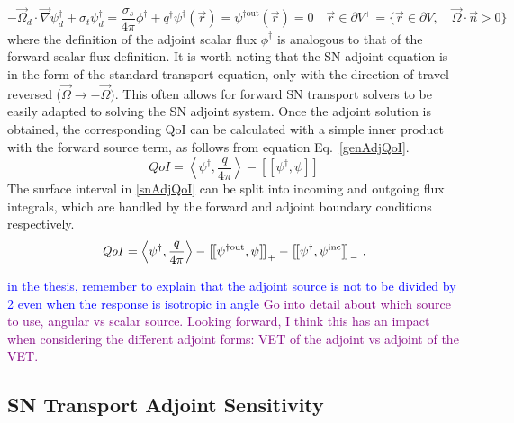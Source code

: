 \documentclass[12pt]{report}
\newcommand{\vr}{\vec{r}}
\newcommand{\vO}{\vec{\Omega}}
\newcommand{\bra}{\left\langle}
\newcommand{\ket}{\right\rangle}
\newcommand{\sbraSN}{\left[ \! \left[}
\newcommand{\sketSN}{\right] \! \right]}
\newcommand{\grad}{\vec{\nabla}}
\newcommand{\bound}{\partial V}
\newcommand{\sigt}{\sigma_t}
\newcommand{\sigs}{\sigma_s}
\newcommand{\angSource}{\frac{q}{4 \pi}}
\newcommand{\scalResp}{q^\dag}
\newcommand{\qoi}{{\it QoI}\xspace}
\newcommand{\comment}[2]{\marginpar{\textcolor{#2}{$\star$}}\textcolor{#2}{#1}\newline}
\newcommand{\jcr}[1]{\comment{#1}{blue}}
\newcommand{\todo}[1]{\comment{#1}{purple}}
\newcommand{\jcr}[1]{\phantom{a}}
\newcommand{\todo}[1]{\phantom{a}}
\begin{document}
\begin{subequations}
\begin{equation}
- \vO_d \cdot \grad \psi^\dag_d + \sigt \psi^\dag_d = \frac{\sigs}{4 \pi} \phi^\dag + \scalResp
\end{equation}
\begin{equation}
\psi^\dag(\vr) = \psi^{\dag \text{out}}(\vr)=0 \quad \vr \in \partial V^{+} = \{  \vr \in \bound , \quad \vO \cdot \vec{n} > 0 \}
\end{equation}
\end{subequations}
where the definition of the adjoint scalar flux $\phi^\dag$ is analogous to that of 
the forward scalar flux definition. It is worth noting that the SN adjoint equation is in the form of the standard transport equation, only with the direction of travel reversed ($\vO \to -\vO)$. This often allows for forward SN transport solvers to be easily adapted to solving the SN adjoint system. Once the adjoint solution is obtained, the corresponding QoI can be calculated with a simple inner product with the forward source term, as follows from equation Eq.~\eqref{genAdjQoI}. %
\begin{equation}
\label{snAdjQoI}
QoI = \bra \psi^\dag , \angSource \ket - \sbraSN \psi^\dag,  \psi \sketSN
\end{equation}
%
The surface interval in \eqref{snAdjQoI} can be split into incoming and outgoing flux integrals, which are handled by the forward and adjoint boundary conditions respectively. 
%
\begin{equation}
\label{snAdjQoIBCsplit}
\qoi = \bra \psi^\dag , \angSource \ket - \sbraSN \psi^{\dag \text{out}},  \psi \sketSN_+ - \sbraSN \psi^\dag,  \psi^{\text{inc}} \sketSN_- \,.
\end{equation}

\jcr{in the thesis, remember to explain that the adjoint source is not to be divided by 2 even when the response is isotropic in angle}
\todo{Go into detail about which source to use, angular vs scalar source. Looking forward, I think this has an impact when considering the different adjoint forms: VET of the adjoint vs adjoint of the VET.}
\subsection{SN Transport Adjoint Sensitivity}
\end{document}
